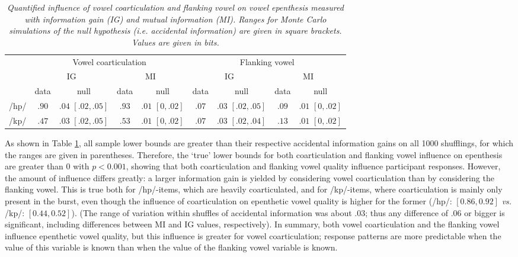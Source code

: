 \begin{table}[h!]
\setlength{\tabcolsep}{2pt}
\centering
    \begin{threeparttable}
    \caption{\textit{Quantified influence of vowel coarticulation and flanking vowel on vowel epenthesis measured with information gain (IG) and mutual information (MI). Ranges for Monte Carlo simulations of the null hypothesis (i.e. accidental information) are given in square brackets. Values are given in bits.}} 
    
    \label{infoth}
    \begin{tabular}{lcccccccc}
        \toprule
             & \multicolumn{4}{c}{Vowel coarticulation} & \multicolumn{4}{c}{Flanking vowel} \\ [0.5ex]
             & \multicolumn{2}{c}{IG} & \multicolumn{2}{c}{MI} & \multicolumn{2}{c}{IG} & \multicolumn{2}{c}{MI} \\ \cmidrule(lr){2-3}\cmidrule(lr){4-5} \cmidrule(lr){6-7}\cmidrule(lr){8-9}   
             & data & null & data & null &  data & null &  data & null  \\
        \midrule
             /hp/ & \textbf{$.90$} & $.04$ $[.02,.05]$  & \textbf{$.93$} & $.01$ $[0,.02]$& \textbf{$.07$} & $.03$ $[.02,.05]$ & \textbf{$.09$} & $.01$  $[0,.02]$  \\  %
             /kp/ & \textbf{$.47$} & $.03$  $[.02,.05]$ & \textbf{$.53$} & $.01$ $[0,.02]$& \textbf{$.07$} & $.03$ $[.02,.04]$& \textbf{$.13$} & $.01$ $[0,.02]$  \\
    \bottomrule
    \end{tabular}
  \end{threeparttable}
\end{table}

As shown in Table \ref{infoth}, all sample lower bounds are greater than their respective accidental information gains on all 1000 shufflings, for which the ranges are given in parentheses. Therefore, the `true' lower bounds for both coarticulation and flanking vowel influence on epenthesis are greater than $0$ with $p<0.001$, showing that both coarticulation and flanking vowel quality influence participant responses. However, the amount of influence differs greatly: a larger information gain is yielded by considering vowel coarticulation  %
than by considering the flanking vowel. This is true both for /hp/-items, which are heavily coarticulated, and for /kp/-items, where coarticulation is mainly only present in the burst, even though the influence of coarticulation on epenthetic vowel quality is higher for the former (/hp/: $[0.86, 0.92]$ \textit{vs.} /kp/: $[0.44, 0.52]$). (The range of variation within shuffles of accidental information was about .03; thus any difference of .06 or bigger is significant, including differences between MI and IG values, respectively). In summary, both vowel coarticulation and the flanking vowel influence epenthetic vowel quality, but this influence is greater for vowel coarticulation; response patterns are more predictable when the value of this variable is known than when the value of the flanking vowel variable is known.

